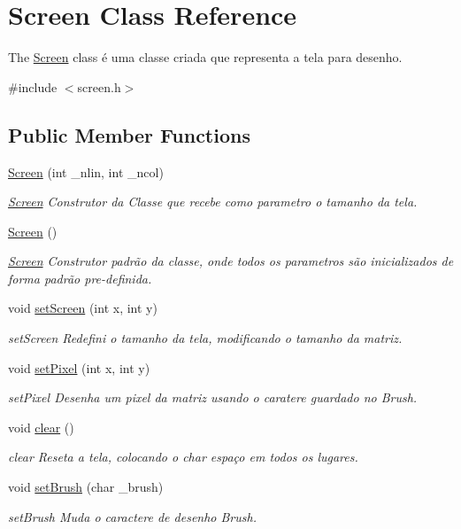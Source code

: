 \hypertarget{class_screen}{}\section{Screen Class Reference}
\label{class_screen}


The \hyperlink{class_screen}{Screen} class é uma classe criada que representa a tela para desenho.  




{\ttfamily \#include $<$screen.\+h$>$}

\subsection*{Public Member Functions}
\begin{DoxyCompactItemize}
\item 
\hyperlink{class_screen_a6c21beca43d25854d8674445127ef2eb}{Screen} (int \+\_\+nlin, int \+\_\+ncol)
\begin{DoxyCompactList}\small\item\em \hyperlink{class_screen}{Screen} Construtor da Classe que recebe como parametro o tamanho da tela. \end{DoxyCompactList}\item 
\hyperlink{class_screen_ae7576476fc6e6a6eaa66389fdc41fe72}{Screen} ()
\begin{DoxyCompactList}\small\item\em \hyperlink{class_screen}{Screen} Construtor padrão da classe, onde todos os parametros são inicializados de forma padrão pre-\/definida. \end{DoxyCompactList}\item 
void \hyperlink{class_screen_a5b1dbaf0fafae393cd925a1058d2a206}{set\+Screen} (int x, int y)
\begin{DoxyCompactList}\small\item\em set\+Screen Redefini o tamanho da tela, modificando o tamanho da matriz. \end{DoxyCompactList}\item 
void \hyperlink{class_screen_ae6bea81c57a22d226507c3c26fa95ee0}{set\+Pixel} (int x, int y)
\begin{DoxyCompactList}\small\item\em set\+Pixel Desenha um pixel da matriz usando o caratere guardado no Brush. \end{DoxyCompactList}\item 
void \hyperlink{class_screen_a35e74266b2a04e37b354ceff7a5f1031}{clear} ()
\begin{DoxyCompactList}\small\item\em clear Reseta a tela, colocando o char espaço em todos os lugares. \end{DoxyCompactList}\item 
void \hyperlink{class_screen_aebc4eb6cb5acf15a0f04c1494622ab23}{set\+Brush} (char \+\_\+brush)
\begin{DoxyCompactList}\small\item\em set\+Brush Muda o caractere de desenho Brush. \end{DoxyCompactList}\end{DoxyCompactItemize}
